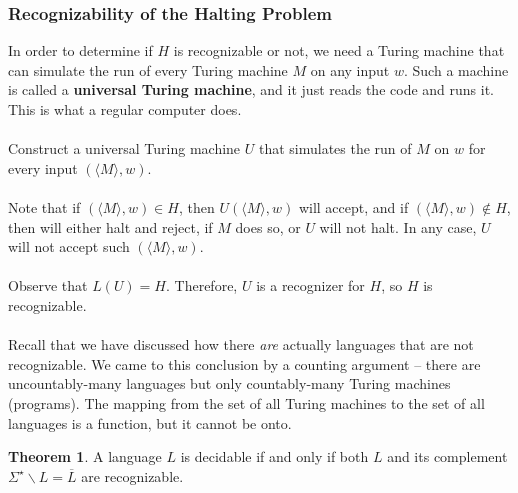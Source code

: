 \documentclass[]{article}
\theoremstyle{definition}
\newtheorem*{theorem}{Theorem}
\newcommand{\lecture}[1]{\marginpar{{\footnotesize $\leftarrow$ \underline{#1}}}}
\begin{document}
    \subsubsection{Recognizability of the Halting Problem} \lecture{November 26, 2013}
      In order to determine if $H$ is recognizable or not, we need a Turing machine that can simulate the run of every Turing machine $M$ on any input $w$. Such a machine is called a \textbf{universal Turing machine}, and it just reads the code and runs it. This is what a regular computer does.
      \\ \\
      Construct a universal Turing machine $U$ that simulates the run of $M$ on $w$ for every input $(\langle M \rangle, w)$.
      \\ \\
      Note that if $(\langle M \rangle, w) \in H$, then $U(\langle M \rangle, w)$ will accept, and if $(\langle M \rangle, w) \not \in H$, then will either halt and reject, if $M$ does so, or $U$ will not halt. In any case, $U$ will not accept such $(\langle M \rangle, w)$.
      \\ \\
      Observe that $L(U) = H$. Therefore, $U$ is a recognizer for $H$, so $H$ is recognizable.
      \\ \\
      Recall that we have discussed how there \emph{are} actually languages that are not recognizable. We came to this conclusion by a counting argument -- there are uncountably-many languages but only countably-many Turing machines (programs). The mapping from the set of all Turing machines to the set of all languages is a function, but it cannot be onto.

      \begin{theorem}
        A language $L$ is decidable if and only if both $L$ and its complement $\Sigma^\star \backslash L = \overline{L}$ are recognizable.
      \end{theorem}
\end{document}
